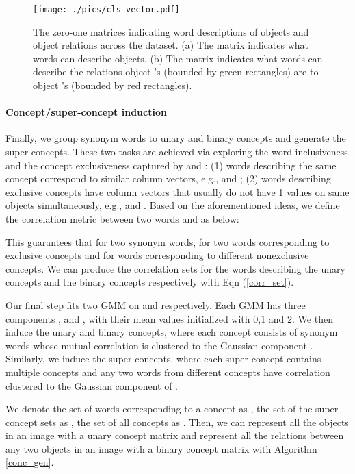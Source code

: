 \documentclass[10pt,twocolumn,letterpaper]{article}
\begin{document}
\begin{figure}
\centering
\texttt{[image: ./pics/cls\_vector.pdf]}
\caption{\small{The zero-one matrices indicating word descriptions of objects and object relations across the dataset. (a) The matrix  indicates what words can describe objects. (b) The matrix  indicates what words can describe the relations object 's (bounded by green rectangles) are to object 's (bounded by red rectangles).}}
\label{cls_vector}
\vspace{-8mm}
\end{figure}

\vspace{-6mm}
\paragraph{Concept/super-concept induction}
Finally, we group synonym words to unary and binary concepts and generate the super concepts. 
These two tasks are achieved via exploring the word inclusiveness and the concept exclusiveness captured by  and :
(1) words describing the same concept correspond to similar column vectors, e.g.,  and ;
(2) words describing exclusive concepts have column vectors that usually do not have 1 values on same objects simultaneously, e.g.,  and . 
Based on the aforementioned ideas, we define the correlation metric between two words  and  as below:
\vspace{-4mm}

This guarantees that  for two synonym words,  for two words corresponding to exclusive concepts and  for words corresponding to different nonexclusive concepts. We can produce the correlation sets for the words describing the unary concepts and the binary concepts respectively with Eqn (\ref{corr_set}).


Our final step fits two GMM on  and  respectively. Each GMM has three components ,  and , with their mean values initialized with 0,1 and 2. 
We then induce the unary and binary concepts, where each concept consists of synonym words whose mutual correlation is clustered to the Gaussian component . 
Similarly, we induce the super concepts, where each super concept contains multiple concepts and any two words from different concepts have correlation clustered to the Gaussian component of .

We denote the set of words corresponding to a concept  as , the set of the super concept sets as , the set of all concepts as . Then, we can represent all the objects in an image with a unary concept matrix  and represent all the relations between any two objects in an image with a binary concept matrix  with Algorithm \ref{conc_gen}.
\end{document}
